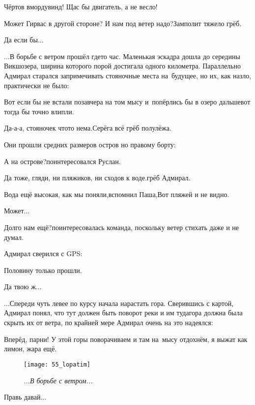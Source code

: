 \diagdash Чёртов вмордувинд! Щас бы двигатель, а не весло!

\diagdash Может Гирвас в другой стороне? И нам под ветер надо?\mdash Замполит тяжело грёб.

\diagdash Да если бы$\ldots$

\vspace{1em}
$\ldots$В борьбе с ветром прошёл где\sdash то час. Маленькая эскадра дошла до середины Викшозера, ширина которого порой достигала одного километра. Параллельно Адмирал старался запримечивать стояночные места на~будущее, но их, как назло, практически не было:

\diagdash Вот если бы не встали позавчера на том мысу и~попёрлись бы в озеро дальше\mdash вот тогда бы точно влипли.

\diagdash Да-а-а, стояночек что\sdash то нема.\mdash Серёга всё грёб полулёжа.

Они прошли средних размеров остров но правому борту:

\diagdash А на острове?\mdash поинтересовался Руслан.

\diagdash Да тоже, гляди, ни пляжиков, ни сходов к воде.\mdash грёб Адмирал.

\diagdash Вода ещё высокая, как мы поняли,\mdash вспомнил Паша,\mdash Вот пляжей и не видно.

\diagdash Может$\ldots$

\diagdash Долго нам ещё?\mdash поинтересовалась команда, поскольку ветер стихать даже и не думал.

Адмирал сверился с GPS:

\diagdash Половину только прошли.

\diagdash Да твою ж$\ldots$

\vspace{1em}
$\ldots$Спереди чуть левее по курсу начала нарастать гора. Сверившись с картой, Адмирал понял, что тут должен быть поворот реки и им туда\mdash гора должна была скрыть их от ветра, по крайней мере Адмирал очень на это надеялся:

\diagdash Вперёд, парни! У этой горы поворачиваем и там на~мысу отдохнём, я выжат как лимон, жара ещё.

\begin{wrapfigure}[15]{l}{0.58\textwidth}
	\centering
	\texttt{[image: 55\_lopatim]}
	\caption{\small\textit{...В борьбе с ветром...}}
\end{wrapfigure}
\diagdash Правь давай$\ldots$

